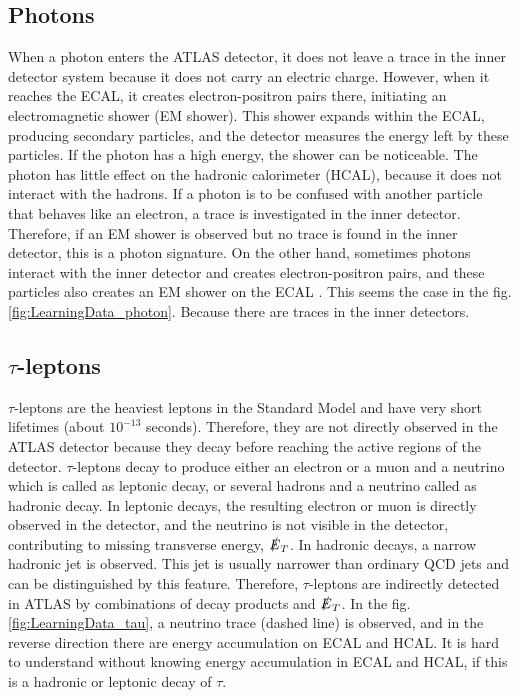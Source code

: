 \subsection{Photons}
\label{subsec:Photons_disp}
When a photon enters the ATLAS detector, it does not leave a trace in the inner detector system because it does not carry an electric charge. However, when it reaches the ECAL, it creates electron-positron pairs there, initiating an electromagnetic shower (EM shower). This shower expands within the ECAL, producing secondary particles, and the detector measures the energy left by these particles. If the photon has a high energy, the shower can be noticeable. The photon has little effect on the hadronic calorimeter (HCAL), because it does not interact with the hadrons. If a photon is to be confused with another particle that behaves like an electron, a trace is investigated in the inner detector. Therefore, if an EM shower is observed but no trace is found in the inner detector, this is a photon signature. On the other hand, sometimes photons interact with the inner detector and creates electron-positron pairs, and these particles also creates an EM shower on the ECAL \cite{hanagaki2023pid}. This seems the case in the fig.\ref{fig:LearningData_photon}. Because there are traces in the inner detectors.


\subsection{\texorpdfstring{$\tau$}{tau}-leptons}
\label{subsec:tauleptons_disp}
$\tau$-leptons are the heaviest leptons in the Standard Model and have very short lifetimes (about $10^{-13}$ seconds). Therefore, they are not directly observed in the ATLAS detector because they decay before reaching the active regions of the detector. $\tau$-leptons decay to produce either an electron or a muon and a neutrino which is called as leptonic decay, or several hadrons and a neutrino called as hadronic decay. In leptonic decays, the resulting electron or muon is directly observed in the detector, and the neutrino is not visible in the detector, contributing to missing transverse energy, $\slashed{E}_T$. In hadronic decays, a narrow hadronic jet is observed. This jet is usually narrower than ordinary QCD jets and can be distinguished by this feature. Therefore, $\tau$-leptons are indirectly detected in ATLAS by combinations of decay products and $\slashed{E}_T$. In the fig.\ref{fig:LearningData_tau}, a neutrino trace (dashed line) is observed, and in the reverse direction there are energy accumulation on ECAL and HCAL. It is hard to understand without knowing energy accumulation in ECAL and HCAL, if this is a hadronic or leptonic decay of $\tau$.


